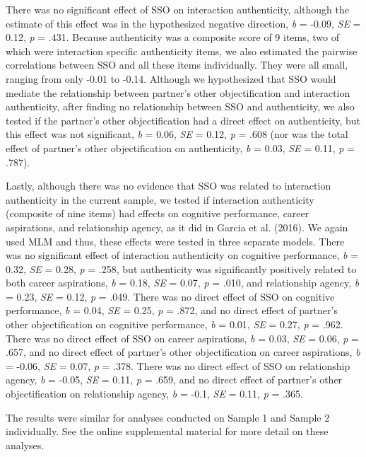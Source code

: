 \documentclass[man]{apa6}
\begin{document}
There was no significant effect of SSO on interaction authenticity,
although the estimate of this effect was in the hypothesized negative
direction, \emph{b} = -0.09, \emph{SE} = 0.12, \emph{p} = .431. Because
authenticity was a composite score of 9 items, two of which were
interaction specific authenticity items, we also estimated the pairwise
correlations between SSO and all these items individually. They were all
small, ranging from only -0.01 to -0.14. Although we hypothesized that
SSO would mediate the relationship between partner's other
objectification and interaction authenticity, after finding no
relationship between SSO and authenticity, we also tested if the
partner's other objectification had a direct effect on authenticity, but
this effect was not significant, \emph{b} = 0.06, \emph{SE} = 0.12,
\emph{p} = .608 (nor was the total effect of partner's other
objectification on authenticity, \emph{b} = 0.03, \emph{SE} = 0.11,
\emph{p} = .787).

Lastly, although there was no evidence that SSO was related to
interaction authenticity in the current sample, we tested if interaction
authenticity (composite of nine items) had effects on cognitive
performance, career aspirations, and relationship agency, as it did in
Garcia et al. (2016). We again used MLM and thus, these effects were
tested in three separate models. There was no significant effect of
interaction authenticity on cognitive performance, \emph{b} = 0.32,
\emph{SE} = 0.28, \emph{p} = .258, but authenticity was significantly
positively related to both career aspirations, \emph{b} = 0.18,
\emph{SE} = 0.07, \emph{p} = .010, and relationship agency, \emph{b} =
0.23, \emph{SE} = 0.12, \emph{p} = .049. There was no direct effect of
SSO on cognitive performance, \emph{b} = 0.04, \emph{SE} = 0.25,
\emph{p} = .872, and no direct effect of partner's other objectification
on cognitive performance, \emph{b} = 0.01, \emph{SE} = 0.27, \emph{p} =
.962. There was no direct effect of SSO on career aspirations, \emph{b}
= 0.03, \emph{SE} = 0.06, \emph{p} = .657, and no direct effect of
partner's other objectification on career aspirations, \emph{b} = -0.06,
\emph{SE} = 0.07, \emph{p} = .378. There was no direct effect of SSO on
relationship agency, \emph{b} = -0.05, \emph{SE} = 0.11, \emph{p} =
.659, and no direct effect of partner's other objectification on
relationship agency, \emph{b} = -0.1, \emph{SE} = 0.11, \emph{p} = .365.

The results were similar for analyses conducted on Sample 1 and Sample 2
individually. See the online supplemental material for more detail on
these analyses.
\end{document}
